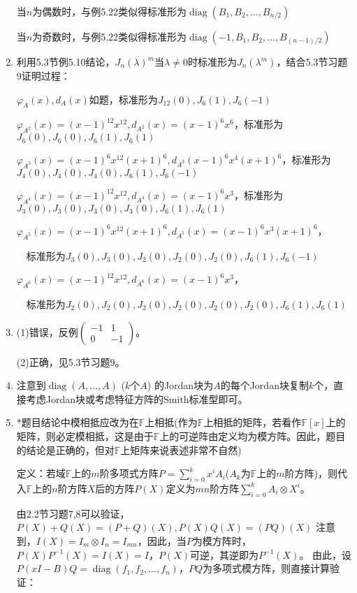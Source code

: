 \documentclass[a4paper,UTF8,fontset=windows]{ctexart}
\DeclareMathOperator{\diag}{diag}
\begin{document}
\begin{enumerate}
当$n$为偶数时，与例5.22类似得标准形为$\diag(B_1,B_2,\dots,B_{n/2})$

当$n$为奇数时，与例5.22类似得标准形为$\diag(-1,B_1,B_2,\dots,B_{(n-1)/2})$

\item
利用5.3节例5.10结论，$J_n(\lambda)^m当\lambda\ne0$时标准形为$J_n(\lambda^m)$，结合5.3节习题9证明过程：

$\varphi_A(x),d_A(x)$如题，标准形为$J_{12}(0),J_6(1),J_6(-1)$

$\varphi_{A^2}(x)=(x-1)^{12}x^{12},d_{A^2}(x)=(x-1)^6x^6$，标准形为$J_6(0),J_6(0),J_6(1),J_6(1)$

$\varphi_{A^3}(x)=(x-1)^6x^{12}(x+1)^6,d_{A^3}(x-1)^6x^4(x+1)^6$，标准形为$J_4(0),J_4(0),J_4(0),J_6(1),J_6(-1)$

$\varphi_{A^4}(x)=(x-1)^{12}x^{12},d_{A^4}(x)=(x-1)^6x^3$，标准形为$J_3(0),J_3(0),J_3(0),J_3(0),J_6(1),J_6(1)$

$\varphi_{A^5}(x)=(x-1)^6x^{12}(x+1)^6,d_{A^5}(x)=(x-1)^6x^3(x+1)^6$，

\ \ 标准形为$J_3(0),J_3(0),J_2(0),J_2(0),J_2(0),J_6(1),J_6(-1)$

$\varphi_{A^6}(x)=(x-1)^{12}x^{12},d_{A^6}(x)=(x-1)^6x^3$，

\ \ 标准形为$J_2(0),J_2(0),J_2(0),J_2(0),J_2(0),J_2(0),J_6(1),J_6(1)$

\item
(1)错误，反例$\begin{pmatrix}-1&1\\0&-1\end{pmatrix}$。

(2)正确，见5.3节习题9。

\item
注意到$\diag(A,\dots,A)$ ($k$个$A$) 的Jordan块为$A$的每个Jordan块复制$k$个，直接考虑Jordan块或考虑特征方阵的Smith标准型即可。

\item
*题目结论中模相抵应改为在$\mathbb{F}$上相抵(作为$\mathbb{F}$上相抵的矩阵，若看作$\mathbb{F}[x]$上的矩阵，则必定模相抵，这是由于$\mathbb{F}$上的可逆阵由定义均为模方阵。因此，题目的结论是正确的，但对$\mathbb{F}$上矩阵来说表述非常不自然)

定义：若域$\mathbb{F}$上的$m$阶多项式方阵$P=\sum_{i=0}^{k}{x^iA_i}$($A_k$为$\mathbb{F}$上的$m$阶方阵)，则代入$\mathbb{F}$上的$n$阶方阵$X$后的方阵$P(X)$定义为$mn$阶方阵$\sum_{i=0}^{k}{A_i\otimes X^i}$。

由2.2节习题7,8可以验证，$P(X)+Q(X)=(P+Q)(X),P(X)Q(X)=(PQ)(X)$
注意到，$I(X)=I_m\otimes I_n=I_{mn}$，因此，当$P$为模方阵时，$P(X)P^{-1}(X)=I(X)=I$，$P(X)$可逆，其逆即为$P^{-1}(X)$。
由此，设$P(xI-B)Q=\diag(f_1,f_2,\dots,f_n)$，$PQ$为多项式模方阵，则直接计算验证：


\end{enumerate}
\end{document}

